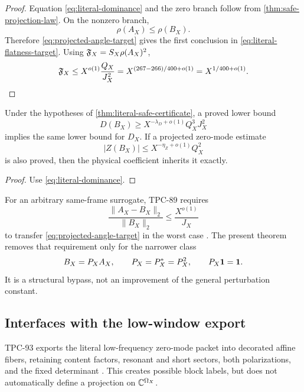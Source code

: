\begin{proof}
Equation \eqref{eq:literal-dominance} and the zero branch follow
from \cref{thm:safe-projection-law}.  On the nonzero branch,
\[
 \rho(A_X)\le\rho(B_X).
\]
Therefore \eqref{eq:projected-angle-target} gives the first
conclusion in \eqref{eq:literal-flatness-target}.  Using
\(\mathfrak F_X=S_X\rho(A_X)^2\),
\[
 \mathfrak F_X
 \le
 X^{o(1)}\frac{Q_X}{J_X^2}
 =
 X^{(267-266)/400+o(1)}
 =
 X^{1/400+o(1)}.
\]
\end{proof}

\begin{corollary}
\label{cor:projected-energy-certificate}
Under the hypotheses of \cref{thm:literal-safe-certificate}, a
proved lower bound
\[
 D(B_X)
 \ge
 X^{-\lambda_D+o(1)}Q_X^3J_X^2
\]
implies the same lower bound for \(D_X\).  If a projected zero-mode
estimate
\[
 |Z(B_X)|
 \le
 X^{-\eta_Z+o(1)}Q_X^2
\]
is also proved, then the physical coefficient inherits it exactly.
\end{corollary}

\begin{proof}
Use \eqref{eq:literal-dominance}.
\end{proof}

\begin{remark}
\label{rem:literal-bypass}
For an arbitrary same-frame surrogate, TPC-89 requires
\[
 \frac{\|A_X-B_X\|_2}{\|B_X\|_2}
 \le\frac{X^{o(1)}}{J_X}
\]
to transfer \eqref{eq:projected-angle-target} in the worst case
\citep{WangTPC89}.  The present theorem removes that requirement
only for the narrower class
\[
 B_X=P_XA_X,\qquad
 P_X=P_X^\ast=P_X^2,\qquad
 P_X\mathbf 1=\mathbf 1.
\]
It is a structural bypass, not an improvement of the general
perturbation constant.
\end{remark}

\subsection{Interfaces with the low-window export}

TPC-93 exports the literal low-frequency zero-mode packet into
decorated affine fibers, retaining content factors, resonant and
short sectors, both polarizations, and the fixed determinant
\citep{WangTPC93}.  This creates possible block labels, but does not
automatically define a projection on \(\mathbb C^{\Omega_X}\).

